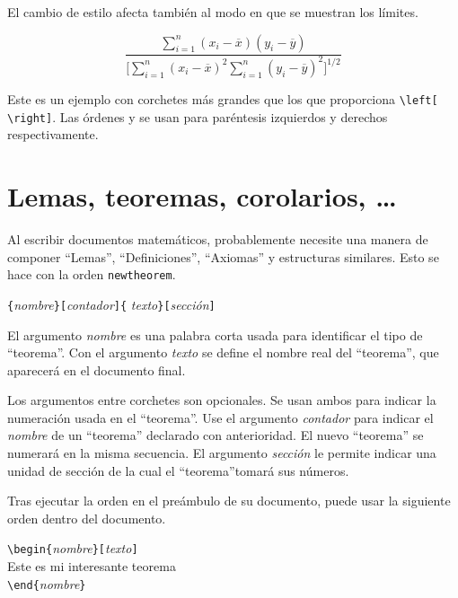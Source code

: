 El cambio de estilo afecta también al modo en que se muestran los límites.
\begin{example}
\begin{displaymath}
\frac{\displaystyle 
\sum_{i=1}^n(x_i-\overline x)
  (y_i-\overline y)} 
  {\displaystyle\biggl[
\sum_{i=1}^n(x_i-\overline x)^2
\sum_{i=1}^n(y_i-\overline y)^2
\biggr]^{1/2}}
\end{displaymath}    
\end{example}

Este es un ejemplo con corchetes más grandes que los que proporciona \verb|\left[ \right]|.  Las órdenes  y  se usan para paréntesis izquierdos y derechos respectivamente.


\section{Lemas, teoremas, corolarios, \ldots}

Al escribir documentos matemáticos, probablemente necesite una manera de componer ``Lemas'', ``Definiciones'', ``Axiomas'' y estructuras similares. Esto se hace con la orden \verb!newtheorem!. 
\begin{lscommand}
\verb|{|\emph{nombre}\verb|}[|\emph{contador}\verb|]{|%
         \emph{texto}\verb|}[|\emph{sección}\verb|]|
\end{lscommand}
El argumento \emph{nombre} es una palabra corta usada para identificar el tipo de ``teorema''.  Con el argumento \emph{texto} se define el nombre real del ``teorema'', que aparecerá en el documento final.

Los argumentos entre corchetes son opcionales.  Se usan ambos para indicar  la numeración usada en el ``teorema''.  Use el argumento \emph{contador} para indicar el \emph{nombre} de un ``teorema'' declarado con anterioridad.  El nuevo ``teorema'' se numerará en la misma secuencia.  El argumento \emph{sección} le permite indicar una unidad de sección de la cual el ``teorema''tomará sus números.

Tras ejecutar la orden  en el preámbulo de su documento, puede usar la siguiente orden dentro del documento.
\begin{code}
\verb|\begin{|\emph{nombre}\verb|}[|\emph{texto}\verb|]|\\
Este es mi interesante teorema\\
\verb|\end{|\emph{nombre}\verb|}|     
\end{code}

